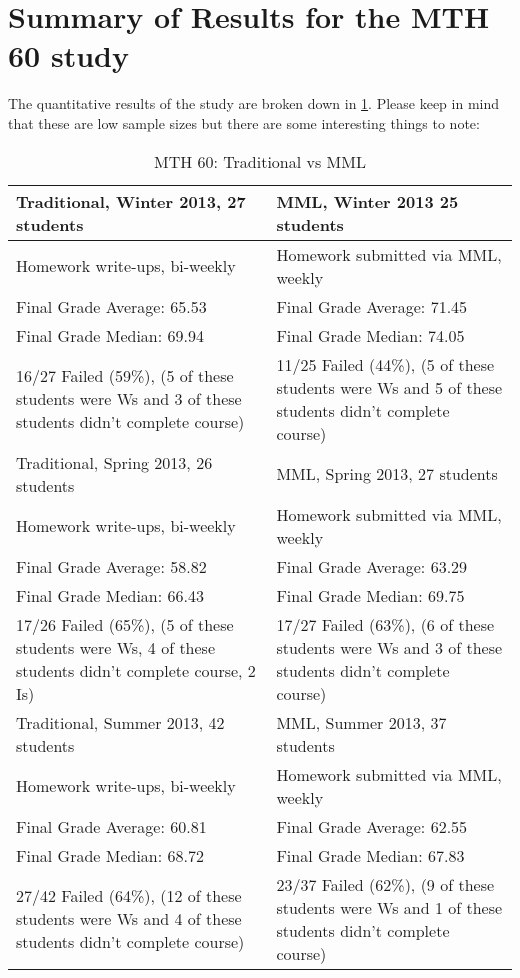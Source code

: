 \section{Summary of Results for the MTH 60 study}
The quantitative results of the study are broken down in \cref{app:tab:onlinehwstudy60}. 
Please keep in mind that these are low sample sizes but there are some interesting things to note: 
\begin{longtable}{p{}p{}}
	\caption{MTH 60: Traditional vs MML}\label{app:tab:onlinehwstudy60}
	\\
	\toprule
	Traditional, Winter 2013, 27 students & MML, Winter 2013 25 students       \\
	\midrule
	Homework write-ups, bi-weekly         & Homework submitted via MML, weekly \\
	Final Grade Average:  65.53           & Final Grade Average:  71.45        \\
	Final Grade Median:  69.94            & Final Grade Median:  74.05         \\
	16/27 Failed (59\%), (5 of these students were Ws and 3 of these students didn't complete course)
	                                      &                                    
	11/25 Failed (44\%), (5 of these students were Ws and 5 of these students didn't complete course)\\
	\midrule
	Traditional, Spring 2013, 26 students & MML, Spring 2013, 27 students      \\
	\midrule
	Homework write-ups, bi-weekly         & Homework submitted via MML, weekly \\
	Final Grade Average:  58.82           & Final Grade Average:  63.29        \\
	Final Grade Median:  66.43            & Final Grade Median:  69.75         \\
	17/26 Failed (65\%), (5 of these students were 
	Ws, 4 of these students didn't complete course, 2 Is)
	                                      &                                    
	17/27 Failed (63\%), (6 of these students were Ws and 3 of these students didn't complete course) \\
	\midrule
	Traditional, Summer 2013, 42 students & MML, Summer 2013, 37 students      \\
	\midrule
	Homework write-ups, bi-weekly         & Homework submitted via MML, weekly \\
	Final Grade Average:  60.81           & Final Grade Average:  62.55        \\
	Final Grade Median:  68.72            & Final Grade Median:  67.83         \\
	27/42 Failed (64\%), (12 of these students were Ws and 4 of these students didn't complete course)
	                                      &                                    
	23/37 Failed (62\%), (9 of these students were Ws and 1 of these students didn't complete course) \\
	\bottomrule
\end{longtable}

